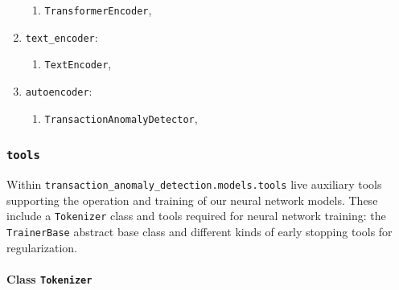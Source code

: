 \documentclass[a4paper, 10pt]{article}
\theoremstyle{plain}
\theoremstyle{definition}
\numberwithin{equation}{section}
\newcommand{\subsubsubsection}[1]{\paragraph{#1}\mbox{}\\}
\begin{document}
\begin{enumerate}
\begin{enumerate}
              \item \texttt{TransformerEncoder},
          \end{enumerate}
    \item \texttt{text\_encoder}:
          \begin{enumerate}
              \item \texttt{TextEncoder},
          \end{enumerate}
    \item \texttt{autoencoder}:
          \begin{enumerate}
              \item \texttt{TransactionAnomalyDetector},
          \end{enumerate}
\end{enumerate}

\subsubsection{\texttt{tools}}
Within \texttt{transaction\_anomaly\_detection.models.tools} live auxiliary tools supporting the operation and training of our neural network models. These include a \texttt{Tokenizer} class and tools required for neural network training: the \texttt{TrainerBase} abstract base class and different kinds of early stopping tools for regularization.

\subsubsubsection{Class \texttt{Tokenizer}}
\end{document}
